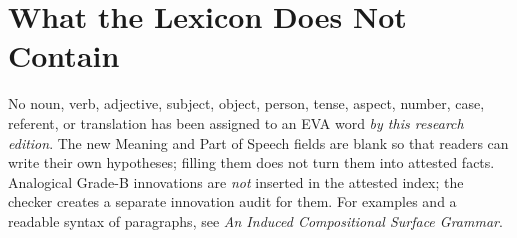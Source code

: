\documentclass[11pt,a4paper]{article}
\begin{document}
\section{What the Lexicon Does Not Contain}
No noun, verb, adjective, subject, object, person, tense, aspect, number, case, referent, or translation has been assigned to an EVA word \emph{by this research edition}. The new Meaning and Part of Speech fields are blank so that readers can write their own hypotheses; filling them does not turn them into attested facts. Analogical Grade-B innovations are \emph{not} inserted in the attested index; the checker creates a separate innovation audit for them. For examples and a readable syntax of paragraphs, see \emph{An Induced Compositional Surface Grammar}.
\end{document}
